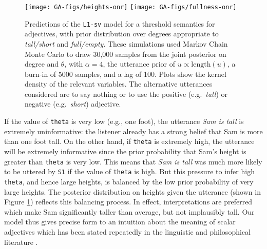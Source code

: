 \documentclass[12pt]{article}
\newcommand{\eq}[1]{
\begin{equation}
\begin{array}{lll}
#1
\end{array}
\end{equation}
}
\begin{document}
\begin{figure}[tbp]
\begin{center}
\texttt{[image: GA-figs/heights-onr]}
\texttt{[image: GA-figs/fullness-onr]}
\caption{Predictions of the \lstinline{L1-sv} model for a threshold semantics for adjectives, with prior distribution over degrees appropriate to \emph{tall/short} and \emph{full/empty}. These simulations used Markov Chain Monte Carlo to draw 30,000 samples from the joint posterior on 
degree and $\theta$, with $\alpha = 4$, the utterance prior of $u \propto \text{length}(u)$, a burn-in of 5000 samples, and a lag of 100. Plots show the kernel density of the relevant variables. 
The alternative utterances considered are to say nothing or to use the positive (e.g.~\emph{tall}) or negative (e.g.~\emph{short}) adjective.
}
\label{GA}
\end{center}
\end{figure}

%
If the value of \lstinline{theta} is very low (e.g., one foot), the utterance \emph{Sam is tall}  is extremely uninformative: the listener already has a strong belief that Sam is more than one foot tall. On the other hand, if \lstinline{theta} is extremely high, the utterance will be extremely informative since the prior probability that Sam's height is greater than \lstinline{theta} is very low. 
This means that \emph{Sam is tall} was much more likely to be uttered by \lstinline{S1} if the value of \lstinline{theta} is high.
But this pressure to infer high \lstinline{theta}, and hence large heights, is balanced by the low prior probability of very large heights. The posterior distribution on heights given the utterance (shown in Figure \ref{GA}) reflects this balancing process. In effect, interpretations are preferred which make Sam significantly taller than average, but not implausibly tall. 
Our model thus gives precise form to an intuition about the meaning of scalar adjectives which has been stated repeatedly in the linguistic and philosophical literature \cite[e.g.][]{bierwisch89,fara00,kennedy07}.
\end{document}
